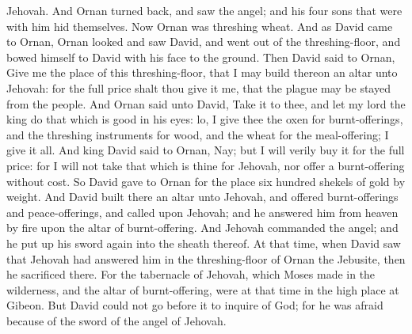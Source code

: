 Jehovah. And Ornan turned back, and saw the angel; and his four sons that were with him hid themselves. Now Ornan was threshing wheat. And as David came to Ornan, Ornan looked and saw David, and went out of the threshing-floor, and bowed himself to David with his face to the ground. Then David said to Ornan, Give me the place of this threshing-floor, that I may build thereon an altar unto Jehovah: for the full price shalt thou give it me, that the plague may be stayed from the people. And Ornan said unto David, Take it to thee, and let my lord the king do that which is good in his eyes: lo, I give thee the oxen for burnt-offerings, and the threshing instruments for wood, and the wheat for the meal-offering; I give it all. And king David said to Ornan, Nay; but I will verily buy it for the full price: for I will not take that which is thine for Jehovah, nor offer a burnt-offering without cost. So David gave to Ornan for the place six hundred shekels of gold by weight. And David built there an altar unto Jehovah, and offered burnt-offerings and peace-offerings, and called upon Jehovah; and he answered him from heaven by fire upon the altar of burnt-offering. And Jehovah commanded the angel; and he put up his sword again into the sheath thereof.  At that time, when David saw that Jehovah had answered him in the threshing-floor of Ornan the Jebusite, then he sacrificed there. For the tabernacle of Jehovah, which Moses made in the wilderness, and the altar of burnt-offering, were at that time in the high place at Gibeon. But David could not go before it to inquire of God; for he was afraid because of the sword of the angel of Jehovah. 


